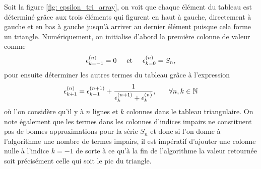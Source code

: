     Soit la figure \ref{fig: epsilon_tri_array}, on voit que chaque élément du
    tableau est déterminé grâce aux trois éléments qui figurent en haut à
    gauche, directement à gauche et en bas à gauche jusqu'à arriver au dernier
    élément puisque cela forme un triangle. Numériquement, on initialise
    d'abord la première colonne de valeur comme
    \begin{align*}
        \epsilon_{k=-1}^{(n)} = 0\hspace{0.5cm}\text{et}\hspace{0.5cm}\epsilon_{k=0}^{(n)} = S_n,
    \end{align*}
    pour ensuite déterminer les autres termes du tableau grâce à l'expression
    \begin{align*}
        \epsilon_{k + 1}^{(n)} = \epsilon_{k - 1}^{(n + 1)} +
        \frac{1}{\epsilon_{k}^{(n + 1)} + \epsilon_{k}^{(n)}},\hspace{0.5cm}\text{ }\forall
        n, k\in\mathbb{N}
    \end{align*}
    où l'on considère qu'il y à $n$ lignes et $k$ colonnes dans le tableau
    triangulaire. On note également que les termes dans les colonnes d'indices
    impairs ne constituent pas de bonnes approximations pour la série $S_n$ et
    donc si l'on donne à l'algorithme une nombre de termes impairs, il est
    impératif d'ajouter une colonne nulle à l'indice $k=-1$ de sorte à ce qu'à
    la fin de l'algorithme la valeur retournée soit précisément celle qui soit
    le pic du triangle.

